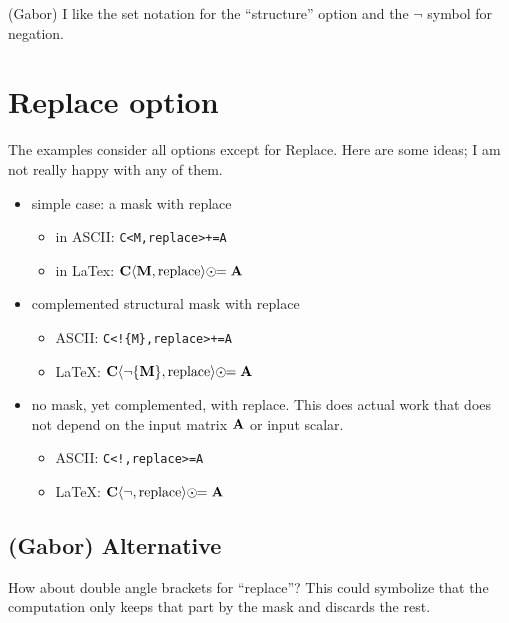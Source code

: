 \documentclass[11pt]{article}
\begin{document}
(Gabor) I like the set notation for the ``structure'' option and the $\neg$ symbol for negation.

\newpage

\section{Replace option}

The examples consider all options except for Replace.
Here are some ideas; I am not really happy with any of them.

\begin{itemize}

\item simple case: a mask with replace

    \begin{itemize}
    \item[] in ASCII: \verb'C<M,replace>+=A'
    \item[] in LaTex: $\bf C \langle M, \mbox{replace} \rangle \odot\!\!= A $
    \end{itemize}

\item complemented structural mask with replace

    \begin{itemize}
    \item[] ASCII: \verb'C<!{M},replace>+=A'
    \item[] LaTeX: ${\bf C} \langle \neg \{{\bf M}\}, \mbox{replace}
    \rangle \odot\!\!= {\bf A}$
    \end{itemize}

\item no mask, yet complemented, with replace.  This does actual work that
does not depend on the input matrix $\bf A$ or input scalar.

    \begin{itemize}
    \item[] ASCII: \verb'C<!,replace>=A'
    \item[] LaTeX: ${\bf C} \langle \neg, \mbox{replace}
    \rangle \odot\!\!= {\bf A}$
    \end{itemize}

\end{itemize}

\subsection{(Gabor) Alternative}

How about double angle brackets for ``replace''? This could symbolize that the computation only keeps that part by the mask and discards the rest.
\end{document}
